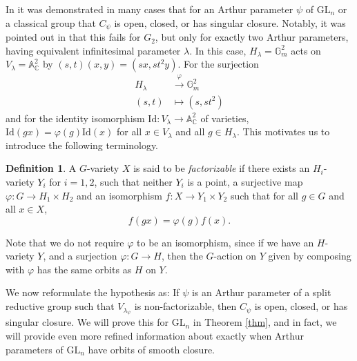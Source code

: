 \documentclass[12pt]{amsart}
\theoremstyle{plain}
\theoremstyle{definition}
\newtheorem{definition}{Definition}
\newcommand{\mb}{\mathbb}
\newcommand{\bc}{\mathbb{C}}
\newcommand{\tx}{\text}
\newcommand{\Rep}{\mathrm{Rep}}
\newcommand{\1}{\mathbbm{1}}
\newcommand{\GL}{\mathrm{GL}}
\begin{document}
	In \cite[Section 2.2]{BCFZ} it was demonstrated in many cases that for an Arthur parameter $\psi$ of $\GL_n$ or a classical group that $C_\psi$ is open, closed, or has singular closure.  
	Notably, it was pointed out in \cite[Example 2.10]{BCFZ} that this fails for $G_2$, but only for exactly two Arthur parameters, having equivalent infinitesimal parameter $\lambda$.    
	In this case, $H_\lambda=\mb{G}_m^2$ acts on $V_\lambda=\mb{A}_\bc^2$ by $(s, t)(x, y)=(sx, st^2y)$.  
	For the surjection
	\begin{align*}
		H_\lambda &\xrightarrow{\varphi} \mb{G}_m^2\\
		(s, t)&\mapsto(s, st^2)
	\end{align*}
	and for the identity isomorphism $\tx{Id}:V_\lambda\to \mb{A}_\bc^2$ of varieties,  $\tx{Id}(gx)=\varphi(g)\tx{Id}(x)$ for all $x\in V_\lambda$ and all $g\in H_\lambda$.  
	This motivates us to introduce the following terminology.  
	
	\begin{definition}
	A  $G$-variety $X$ is said to be \emph{factorizable} if there exists an $H_i$-variety $Y_i$ for $i=1, 2$, such that neither $Y_i$ is a point, a surjective map $\varphi:G\to H_1\times H_2$ and an isomorphism $f:X\to Y_1\times Y_2$ such that for all $g\in G$ and all $x\in X$,
	$$f(gx)=\varphi(g)f(x).$$
	\end{definition}
	
	Note that we do not require $\varphi$ to be an isomorphism, since if we have an $H$-variety $Y$, and a surjection $\varphi:G\to H$, then the $G$-action on $Y$ given by composing with $\varphi$ has the same orbits as $H$ on $Y$. 
	
	We now reformulate the hypothesis as:  If $\psi$ is an Arthur parameter of a split reductive group such that $V_{\lambda_\psi}$ is non-factorizable, then $C_\psi$ is open, closed, or has singular closure.   
	We will prove this for $\GL_n$ in Theorem \ref{thm}, and in fact, we will provide even more refined information about exactly when Arthur parameters of $\GL_n$ have orbits of smooth closure.  
	

	
\end{document}
